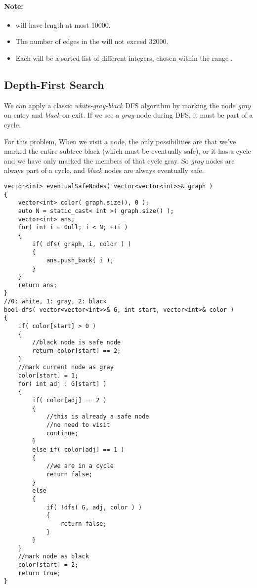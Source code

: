 \paragraph{Note:}

\begin{itemize}
\item {} will have length at most 10000.
\item The number of edges in the  will not exceed 32000.
\item Each  will be a sorted list of different integers, chosen within the range .
\end{itemize}

\subsection{Depth-First Search}
We can apply a classic \textit{white-gray-black} DFS algorithm by marking the node \textit{gray} on entry and \textit{black} on exit. If we see a \textit{gray} node during DFS, it must be part of a cycle.

For this problem, When we visit a node, the only possibilities are that we've marked the entire subtree black (which must be eventually safe), or it has a cycle and we have only marked the members of that cycle gray. So \textit{gray} nodes are always part of a cycle, and \textit{black} nodes are always eventually safe.

\setcounter{lstlisting}{0}
\begin{lstlisting}[style=customc, caption={DP}]
vector<int> eventualSafeNodes( vector<vector<int>>& graph )
{
    vector<int> color( graph.size(), 0 );
    auto N = static_cast< int >( graph.size() );
    vector<int> ans;
    for( int i = 0ull; i < N; ++i )
    {
        if( dfs( graph, i, color ) )
        {
            ans.push_back( i );
        }
    }
    return ans;
}
//0: white, 1: gray, 2: black
bool dfs( vector<vector<int>>& G, int start, vector<int>& color )
{
    if( color[start] > 0 )
    {
        //black node is safe node
        return color[start] == 2;
    }
    //mark current node as gray
    color[start] = 1;
    for( int adj : G[start] )
    {
        if( color[adj] == 2 )
        {
            //this is already a safe node
            //no need to visit
            continue;
        }
        else if( color[adj] == 1 )
        {
            //we are in a cycle
            return false;
        }
        else
        {
            if( !dfs( G, adj, color ) )
            {
                return false;
            }
        }
    }
    //mark node as black
    color[start] = 2;
    return true;
}
\end{lstlisting}